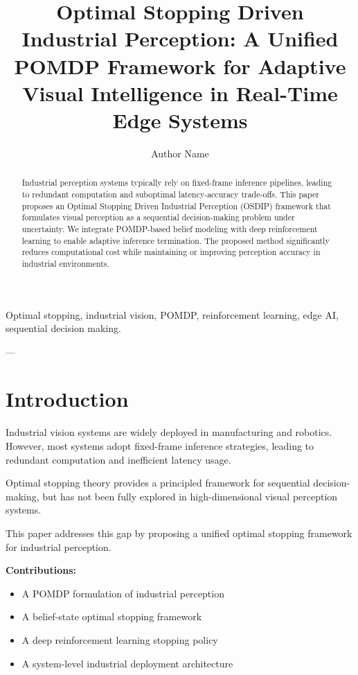 \documentclass[journal]{IEEEtran}
\title{Optimal Stopping Driven Industrial Perception: A Unified POMDP Framework for Adaptive Visual Intelligence in Real-Time Edge Systems}
\author{Author Name}
\begin{document}
\maketitle

\begin{abstract}
Industrial perception systems typically rely on fixed-frame inference pipelines, leading to redundant computation and suboptimal latency-accuracy trade-offs. This paper proposes an Optimal Stopping Driven Industrial Perception (OSDIP) framework that formulates visual perception as a sequential decision-making problem under uncertainty. We integrate POMDP-based belief modeling with deep reinforcement learning to enable adaptive inference termination. The proposed method significantly reduces computational cost while maintaining or improving perception accuracy in industrial environments.
\end{abstract}

\begin{IEEEkeywords}
Optimal stopping, industrial vision, POMDP, reinforcement learning, edge AI, sequential decision making.
\end{IEEEkeywords}

---

\section{Introduction}

Industrial vision systems are widely deployed in manufacturing and robotics. However, most systems adopt fixed-frame inference strategies, leading to redundant computation and inefficient latency usage.

Optimal stopping theory provides a principled framework for sequential decision-making, but has not been fully explored in high-dimensional visual perception systems.

This paper addresses this gap by proposing a unified optimal stopping framework for industrial perception.

\textbf{Contributions:}
\begin{itemize}
    \item A POMDP formulation of industrial perception
    \item A belief-state optimal stopping framework
    \item A deep reinforcement learning stopping policy
    \item A system-level industrial deployment architecture
\end{itemize}
\end{document}
